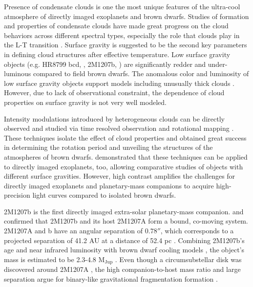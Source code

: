 \documentclass[apj]{emulateapj}
\newcommand{\revise}[1]{\textbf{{\color{cyan}{#1}}}}
\renewcommand{\revise}{}
\begin{document}
Presence of condensate clouds is one the most unique features of the
ultra-cool atmosphere of directly imaged exoplanets and brown
dwarfs. Studies of formation and properties of condensate clouds
\citep[e.g.][]{Ackerman2001, Burrows2006a, Helling2008, Allard2012}
have made great progress on the cloud behaviors across different
spectral types, especially the role that clouds play in the L-T
transition \citep[e.g.][]{Burrows2006a, Marley2010}.  Surface gravity
is suggested to be the second key parameters in defining cloud
structures \citep[e.g.][]{Marley2012} after effective temperature. Low
surface gravity objects (e.g. HR8799 bcd, \cite{Marois2008a}, 2M1207b, \cite{Chauvin2004}) are significantly redder and under-luminous
compared to field brown dwarfs.  The anomalous color and luminosity of
low surface gravity objects support models including unusually thick
clouds \citep{Currie2011, Madhusudhan2011,Skemer2011,
  Skemer2012}. However, due to lack of observational constraint, the
dependence of cloud properties on surface gravity is not very well
modeled.

Intensity modulations introduced by heterogeneous clouds can be
directly observed and studied via time resolved observation and
rotational mapping
\citep[e.g.][]{Apai2013,Buenzli2012,Buenzli2015,Burgasser2013,Radigan2012,Yang2015,Metchev2015,Heinze2015,
Biller2015}. These techniques isolate the effect of cloud
properties and obtained great success in determining the rotation
period and unveiling the structures of the atmospheres of brown dwarfs.
 \citet{Kostov2013} demonstrated that these techniques can be applied to directly imaged
exoplanets, too, allowing comparative studies of objects with
different surface gravities. However, high contrast amplifies the
challenges for directly imaged exoplanets and planetary-mass
companions to acquire high-precision light curves compared to
\revise{isolated} brown
dwarfs.


2M1207b \citet{Chauvin2004} is the first directly imaged extra-solar
planetary-mass companion. \citet{Chauvin2005} and \citet{Song2006}
confirmed that 2M1207b and its host 2M1207A form a bound, co-moving
system. 2M1207A and b have an angular separation of $0.78''$, which
corresponds to a projected separation of 41.2 AU at a distance of 52.4
pc \citep[e.g.][]{Ducourant2008}. Combining 2M1207b's age and near
infrared luminosity with brown dwarf cooling models
\citep[e.g.][]{Baraffe2003}, the object's mass is estimated to be
2.3-4.8 M$_{\mathrm{Jup}}$ \citep{Barman2011b}. Even though a
circumsubstellar disk was discovered around 2M1207A
\citep[][]{Sterzik2004}, the high companion-to-host mass ratio and
large separation argue for binary-like gravitational fragmentation
formation \revise{\citep{Lodato2005,Mohanty2007}}.
\end{document}
